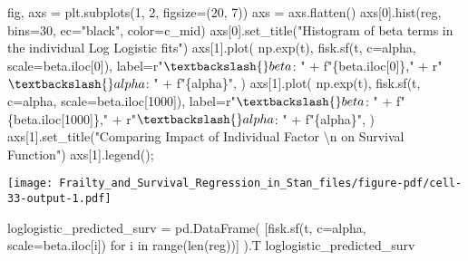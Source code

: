 \documentclass[
  letterpaper,
  DIV=11,
  numbers=noendperiod]{scrartcl}
\newenvironment{Shaded}{\begin{snugshade}}{\end{snugshade}}
\newcommand{\BuiltInTok}[1]{\textcolor[rgb]{0.00,0.23,0.31}{#1}}
\newcommand{\CharTok}[1]{\textcolor[rgb]{0.13,0.47,0.30}{#1}}
\newcommand{\ControlFlowTok}[1]{\textcolor[rgb]{0.00,0.23,0.31}{#1}}
\newcommand{\DecValTok}[1]{\textcolor[rgb]{0.68,0.00,0.00}{#1}}
\newcommand{\KeywordTok}[1]{\textcolor[rgb]{0.00,0.23,0.31}{#1}}
\newcommand{\NormalTok}[1]{\textcolor[rgb]{0.00,0.23,0.31}{#1}}
\newcommand{\OperatorTok}[1]{\textcolor[rgb]{0.37,0.37,0.37}{#1}}
\newcommand{\SpecialCharTok}[1]{\textcolor[rgb]{0.37,0.37,0.37}{#1}}
\newcommand{\SpecialStringTok}[1]{\textcolor[rgb]{0.13,0.47,0.30}{#1}}
\newcommand{\StringTok}[1]{\textcolor[rgb]{0.13,0.47,0.30}{#1}}
\newcommand{\VerbatimStringTok}[1]{\textcolor[rgb]{0.13,0.47,0.30}{#1}}
\begin{document}
\begin{Shaded}
\begin{Highlighting}[]
\NormalTok{fig, axs }\OperatorTok{=}\NormalTok{ plt.subplots(}\DecValTok{1}\NormalTok{, }\DecValTok{2}\NormalTok{, figsize}\OperatorTok{=}\NormalTok{(}\DecValTok{20}\NormalTok{, }\DecValTok{7}\NormalTok{))}
\NormalTok{axs }\OperatorTok{=}\NormalTok{ axs.flatten()}
\NormalTok{axs[}\DecValTok{0}\NormalTok{].hist(reg, bins}\OperatorTok{=}\DecValTok{30}\NormalTok{, ec}\OperatorTok{=}\StringTok{"black"}\NormalTok{, color}\OperatorTok{=}\NormalTok{c\_mid)}
\NormalTok{axs[}\DecValTok{0}\NormalTok{].set\_title(}\StringTok{"Histogram of beta terms in the individual Log Logistic fits"}\NormalTok{)}
\NormalTok{axs[}\DecValTok{1}\NormalTok{].plot(}
\NormalTok{    np.exp(t),}
\NormalTok{    fisk.sf(t, c}\OperatorTok{=}\NormalTok{alpha, scale}\OperatorTok{=}\NormalTok{beta.iloc[}\DecValTok{0}\NormalTok{]),}
\NormalTok{    label}\OperatorTok{=}\VerbatimStringTok{r"$\textbackslash{}beta$: "} \OperatorTok{+} \SpecialStringTok{f"}\SpecialCharTok{\{}\NormalTok{beta}\SpecialCharTok{.}\NormalTok{iloc[}\DecValTok{0}\NormalTok{]}\SpecialCharTok{\}}\SpecialStringTok{,"} \OperatorTok{+} \VerbatimStringTok{r"$\textbackslash{}alpha$: "} \OperatorTok{+} \SpecialStringTok{f"}\SpecialCharTok{\{}\NormalTok{alpha}\SpecialCharTok{\}}\SpecialStringTok{"}\NormalTok{,}
\NormalTok{)}
\NormalTok{axs[}\DecValTok{1}\NormalTok{].plot(}
\NormalTok{    np.exp(t),}
\NormalTok{    fisk.sf(t, c}\OperatorTok{=}\NormalTok{alpha, scale}\OperatorTok{=}\NormalTok{beta.iloc[}\DecValTok{1000}\NormalTok{]),}
\NormalTok{    label}\OperatorTok{=}\VerbatimStringTok{r"$\textbackslash{}beta$: "} \OperatorTok{+} \SpecialStringTok{f"}\SpecialCharTok{\{}\NormalTok{beta}\SpecialCharTok{.}\NormalTok{iloc[}\DecValTok{1000}\NormalTok{]}\SpecialCharTok{\}}\SpecialStringTok{,"} \OperatorTok{+} \VerbatimStringTok{r"$\textbackslash{}alpha$: "} \OperatorTok{+} \SpecialStringTok{f"}\SpecialCharTok{\{}\NormalTok{alpha}\SpecialCharTok{\}}\SpecialStringTok{"}\NormalTok{,}
\NormalTok{)}
\NormalTok{axs[}\DecValTok{1}\NormalTok{].set\_title(}\StringTok{"Comparing Impact of Individual Factor }\CharTok{\textbackslash{}n}\StringTok{ on Survival Function"}\NormalTok{)}
\NormalTok{axs[}\DecValTok{1}\NormalTok{].legend()}\OperatorTok{;}
\end{Highlighting}
\end{Shaded}

\texttt{[image: Frailty\_and\_Survival\_Regression\_in\_Stan\_files/figure-pdf/cell-33-output-1.pdf]}

\begin{Shaded}
\begin{Highlighting}[]
\NormalTok{loglogistic\_predicted\_surv }\OperatorTok{=}\NormalTok{ pd.DataFrame(}
\NormalTok{    [fisk.sf(t, c}\OperatorTok{=}\NormalTok{alpha, scale}\OperatorTok{=}\NormalTok{beta.iloc[i]) }\ControlFlowTok{for}\NormalTok{ i }\KeywordTok{in} \BuiltInTok{range}\NormalTok{(}\BuiltInTok{len}\NormalTok{(reg))]}
\NormalTok{).T}
\NormalTok{loglogistic\_predicted\_surv}
\end{Highlighting}
\end{Shaded}
\end{document}
